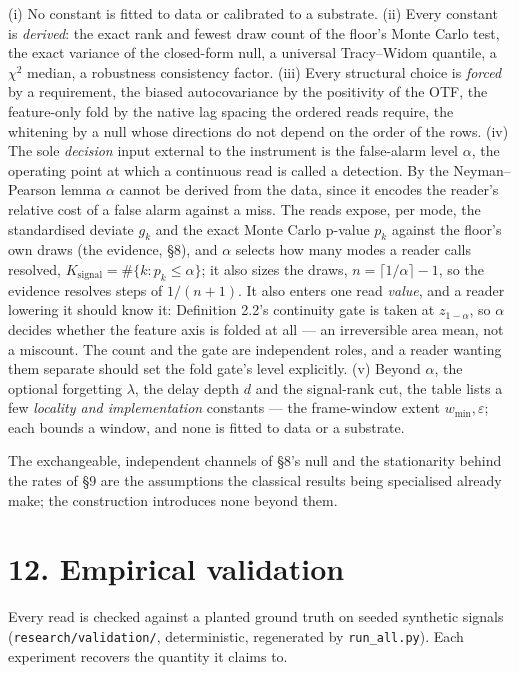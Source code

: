 \documentclass[10pt,letterpaper,twocolumn]{article}
\begin{document}
(i) No constant is fitted to data or calibrated to a substrate. (ii) Every constant is \emph{derived}: the exact rank and fewest draw count of the floor's Monte Carlo test, the exact variance of the closed-form null, a universal Tracy--Widom quantile, a \(\chi^2\) median, a robustness consistency factor. (iii) Every structural choice is \emph{forced} by a requirement, the biased autocovariance by the positivity of the OTF, the feature-only fold by the native lag spacing the ordered reads require, the whitening by a null whose directions do not depend on the order of the rows. (iv) The sole \emph{decision} input external to the instrument is the false-alarm level \(\alpha\), the operating point at which a continuous read is called a detection. By the Neyman--Pearson lemma \(\alpha\) cannot be derived from the data, since it encodes the reader's relative cost of a false alarm against a miss. The reads expose, per mode, the standardised deviate \(g_k\) and the exact Monte Carlo p-value \(p_k\) against the floor's own draws (the evidence, §8), and \(\alpha\) selects how many modes a reader calls resolved, \(K_{\mathrm{signal}}=\#\{k:p_k\le\alpha\}\); it also sizes the draws, \(n=\lceil1/\alpha\rceil-1\), so the evidence resolves steps of \(1/(n+1)\). It also enters one read \emph{value}, and a reader lowering it should know it: Definition 2.2's continuity gate is taken at \(z_{1-\alpha}\), so \(\alpha\) decides whether the feature axis is folded at all --- an irreversible area mean, not a miscount. The count and the gate are independent roles, and a reader wanting them separate should set the fold gate's level explicitly. (v) Beyond \(\alpha\), the optional forgetting \(\lambda\), the delay depth \(d\) and the signal-rank cut, the table lists a few \emph{locality and implementation} constants --- the frame-window extent \(w_{\min},\varepsilon\); each bounds a window, and none is fitted to data or a substrate.

The exchangeable, independent channels of §8's null and the stationarity behind the rates of §9 are the assumptions the classical results being specialised already make; the construction introduces none beyond them.

\section{12. Empirical validation}\label{12-empirical-validation}

Every read is checked against a planted ground truth on seeded synthetic signals (\texttt{research/\allowbreak{}validation/\allowbreak{}}, deterministic, regenerated by \texttt{run\_\allowbreak{}all.\allowbreak{}py}). Each experiment recovers the quantity it claims to.
\end{document}
